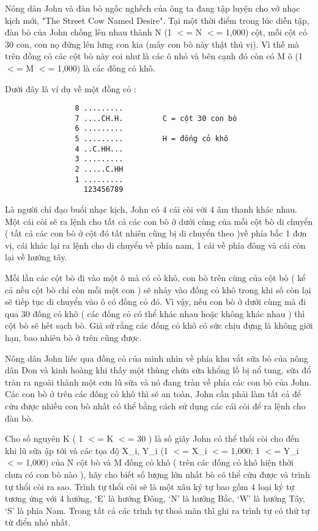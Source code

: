 



   Nông dân John và đàn bò ngốc nghếch của ông ta đang tập luyện cho vở  nhạc kịch mới, "The Street Cow Named Desire". Tại một thời điểm trong  lúc diễn tập, đàn bò của John chồng lên nhau thành N (1 $<$= N $<$= 1,000)  cột, mỗi cột có 30 con, con nọ đứng lên lưng con kia (mấy con bò này thật  thú vị). Vì thế mà trên đồng cỏ các cột bò này coi như là các ô nhỏ và  bên cạnh đó còn có M ô (1 $<$= M $<$= 1,000) là các đống cỏ khô.  

   Dưới đây là ví dụ về một đồng cỏ :  
\begin{verbatim}
                8 .........
                7 ....CH.H.         C = cột 30 con bò
                6 .........
                5 .........         H = đống cỏ khô
                4 ..C.HH...
                3 .........
                2 .....C.HH
                1 .........
                  123456789
\end{verbatim}

   Là người chỉ đạo buổi nhạc kịch, John có 4 cái còi với 4 âm thanh khác nhau. Một cái còi sẽ ra lệnh cho tất cả các con bò ở dưới cùng của mỗi cột bò  di chuyển ( tất cả các con bò ở cột đó tất nhiên cũng bị di chuyển theo )về phía  bắc 1 đơn vị, cái khác lại ra lệnh cho di chuyển về phía nam, 1 cái  về phía đông và cái còn lại về hướng tây.  

   Mỗi lần các cột bò đi vào một ô mà có cỏ khô, con bò trên cùng của cột  bò ( kể cả nếu cột bò chỉ còn mỗi một con ) sẽ nhảy vào đống cỏ khô trong  khi số còn lại sẽ tiếp tục di chuyển vào ô có đống cỏ đó. Vì vậy, nếu con  bò ở dưới cùng mà đi qua 30 đống cỏ khô ( các đống cỏ có thể khác nhau  hoặc không khác nhau ) thì cột bò sẽ hết sạch bò. Giả sử rằng các đống cỏ  khô có sức chịu đựng là không giới hạn, bao nhiêu bò ở trên cũng được.  

   Nông dân John liếc qua đồng cỏ của mình nhìn về phía khu vắt sữa bò  của nông dân Don và kinh hoàng khi thấy một thùng chứa sữa khổng lồ  bị nổ tung, sữa đổ tràn ra ngoài thành một cơn lũ sữa và nó đang  tràn về phía các con bò của John. Các con bò ở trên các đống cỏ khô  thì sẽ an toàn, John cần phải làm tất cả để cứu được nhiều con bò nhất  có thể bằng cách sử dụng các cái còi để ra lệnh cho đàn bò.  

   Cho số nguyên K ( 1 $<$= K $<$= 30 ) là số giây John có thể thổi còi cho  đến khi lũ sữa ập tới và các tọa độ X\_i, Y\_i (1 $<$= X\_i $<$= 1,000;  1 $<$= Y\_i $<$= 1,000) của N cột bò và M đống cỏ khô ( trên các đống  cỏ khô hiện thời chưa có con bò nào ), hãy cho biết số lượng lớn nhất bò  có thể cứu được và trình tự thổi còi ra sao. Trình tự thổi còi sẽ  là một xâu ký tự bao gồm 4 loại ký tự tương ứng với 4 hướng, ‘E’ là  hướng Đông, ‘N’ là hướng Bắc, ‘W’ là hướng Tây, ‘S’ là phía Nam.  Trong tất cả các trình tự thoả mãn thì ghi ra trình tự có thứ tự từ điển nhỏ nhất.  

